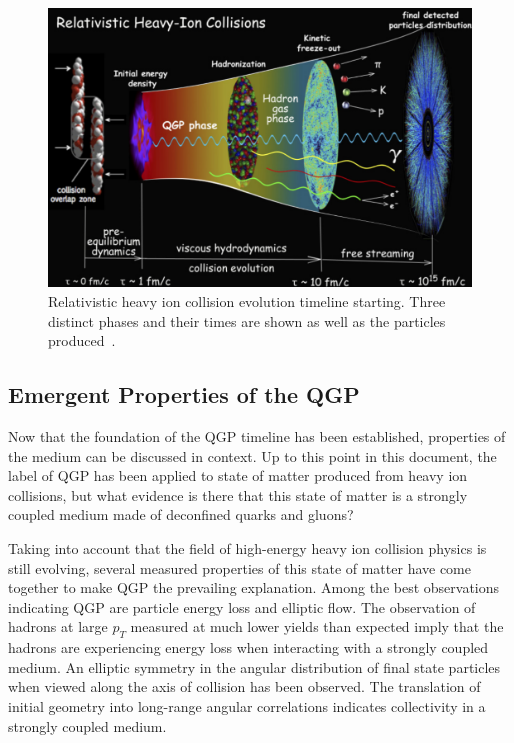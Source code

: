 \begin{figure}[!ht]
\begin{center}
\includegraphics[width=0.78\linewidth]{figs/qgp_evolution_timeline.png}
\caption{Relativistic heavy ion collision evolution timeline starting. Three distinct phases and their times are shown as well as the particles produced~\cite{Heinz:2013wva}.}
\end{center}
\label{fig:qgp_timeline}
\end{figure}

\subsection{Emergent Properties of the QGP}
Now that the foundation of the QGP timeline has been established, properties of the medium can be discussed in context. Up to this point in this document, the label of QGP has been applied to state of matter produced from heavy ion collisions, but what evidence is there that this state of matter is a strongly coupled medium made of deconfined quarks and gluons?

Taking into account that the field of high-energy heavy ion collision physics is still evolving, several measured properties of this state of matter have come together to make QGP the prevailing explanation. Among the best observations indicating QGP are particle energy loss and elliptic flow. The observation of hadrons at large $p_T$ measured at much lower yields than expected imply that the hadrons are experiencing energy loss when interacting with a strongly coupled medium.  An elliptic symmetry in the angular distribution of final state particles when viewed along the axis of collision has been observed. The translation of initial geometry into long-range angular correlations indicates collectivity in a strongly coupled medium.


